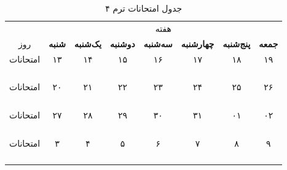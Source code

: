 \documentclass{article}
\begin{document}
	
	\begin{table}[h]
		\begin{center}	
			\caption{جدول امتحانات ترم ۴}	
			\begin{tabular}{|c|c|c|c|c|c|c|c|}
				\cline{2-8}
				\multicolumn{1}{c}{} &
				\multicolumn{7}{|c|}{هفته} \\
				\cline{1-8}
				
				\multicolumn{1}{|c|}{روز} &
				\textbf{شنبه} &
				\textbf{یک‌شنبه} & 
				\textbf{دوشنبه} & 
				\textbf{سه‌شنبه} & 
				\textbf{چهارشنبه} & 
				\textbf{پنج‌شنبه} & 
				\textbf{جمعه} \\ 
				\hline
				
				\multirow{5}{*}{امتحانات}
				& ۱۳ & ۱۴ & ۱۵ & ۱۶ & ۱۷ & ۱۸ & ۱۹ \\
				\cline{2-8}
				& & & & & & & \\
				\cline{2-8}				
				& & & & & & & \\
				\cline{2-8}
				& & & & & & & \\
				\cline{2-8}				
				& & & & & & & \\
				\hline \hline
				
				\multirow{5}{*}{امتحانات}
				& ۲۰ & ۲۱ & ۲۲ & ۲۳ & ۲۴ & ۲۵ & ۲۶ \\
				\cline{2-8}
				& & & & & & & \\
				\cline{2-8}				
				& & & & & & & \\
				\cline{2-8}
				& & & & & & & \\
				\cline{2-8}				
				& & & & & & & \\
				\hline \hline

				\multirow{5}{*}{امتحانات}
				& ۲۷ & ۲۸ & ۲۹ & ۳۰ & ۳۱ & ۰۱ & ۰۲ \\
				\cline{2-8}
				& & & & & & & \\
				\cline{2-8}				
				& & & & & & & \\
				\cline{2-8}
				& & & & & & & \\
				\cline{2-8}				
				& & & & & & & \\
				\hline \hline

				\multirow{5}{*}{امتحانات}
				& ۳ & ۴ & ۵ & ۶ & ۷ & ۸ & ۹ \\
				\cline{2-8}
				& & & & & & & \\
				\cline{2-8}				
				& & & & & & & \\
				\cline{2-8}
				& & & & & & & \\
				\cline{2-8}				
				& & & & & & & \\
				\hline \hline
				
				
			\end{tabular}
		\end{center}
	\end{table}
\end{document}
